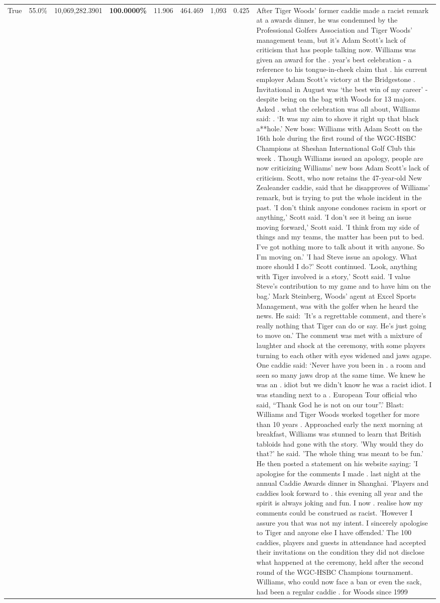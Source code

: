 \begin{table}[H]
\begin{tabular}{lllrlllll}
True & 55.0\% & 10,069,282.3901 & \bfseries \color{red} 100.0000\% & 11.906 & 464.469 & 1,093 & 0.425 & After Tiger Woods' former caddie made a racist remark at a awards dinner, he was condemned by the Professional Golfers Association and Tiger Woods' management team, but it's Adam Scott's lack of criticism that has people talking now. Williams was given an award for the . year’s best celebration - a reference to his tongue-in-cheek claim that . his current employer Adam Scott’s victory at the Bridgestone . Invitational in August was ‘the best win of my career’ - despite being on the bag with Woods for 13 majors. Asked . what the celebration was all about, Williams said: . ‘It was my aim to shove it right up that black a**hole.’ New boss: Williams with Adam Scott  on the 16th hole during the first round of the WGC-HSBC Champions at Sheshan International Golf Club this week . Though Williams issued an apology, people are now criticizing Williams' new boss Adam Scott's lack of criticism. Scott, who now retains the 47-year-old New Zealeander caddie, said that he disapproves of Williams' remark, but is trying to put the whole incident in the past. 'I don't think anyone condones racism in sport or anything,' Scott said. 'I don't see it being an issue moving forward,' Scott said. 'I think from my side of things and my teams, the matter has been put to bed. I've got nothing more to talk about it with anyone. So I'm moving on.' 'I had Steve issue an apology. What more should I do?' Scott continued. 'Look, anything with Tiger involved is a story,' Scott said. 'I value Steve's contribution to my game and to have him on the bag.' Mark Steinberg, Woods' agent at Excel Sports Management, was with the golfer when he heard the news. He said: 'It's a regrettable comment, and there's really nothing that Tiger can do or say. He's just going to move on.' The comment was met with a mixture of laughter and shock at the ceremony, with some players turning to each other with eyes widened and jaws agape. One caddie said: ‘Never have you been in . a room and seen so many jaws drop at the same time. We knew he was an . idiot but we didn’t know he was a racist idiot. I was standing next to a . European Tour official who said, “Thank God he is not on our tour”.’ Blast: Williams and Tiger Woods worked together for more than 10 years . Approached early the next morning at breakfast, Williams was stunned to learn that British tabloids had gone with the story. 'Why would they do that?' he said. 'The whole thing was meant to be fun.' He then posted a statement on his website saying: 'I apologise for the comments I made . last night at the annual Caddie Awards dinner in Shanghai. 'Players and caddies look forward to . this evening all year and the spirit is always joking and fun. I now . realise how my comments could be construed as racist. 'However I assure you that was not my intent. I sincerely apologise to Tiger and anyone else I have offended.' The 100 caddies, players and guests in attendance had accepted their invitations on the condition they did not disclose what happened at the ceremony, held after the second round of the WGC-HSBC Champions tournament. Williams, who could now face a ban or even the sack, had been a regular caddie . for Woods since 1999 
\end{tabular}
\end{table}
